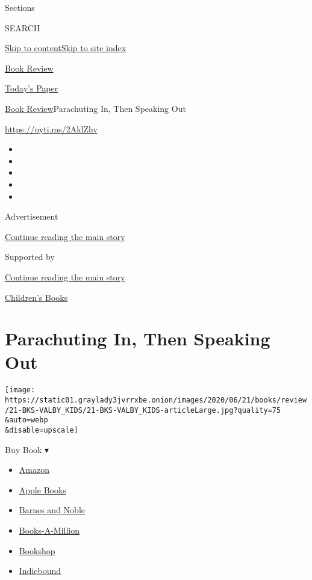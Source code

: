 Sections

SEARCH

\protect\hyperlink{site-content}{Skip to
content}\protect\hyperlink{site-index}{Skip to site index}

\href{https://www.nytimes3xbfgragh.onion/section/books/review}{Book
Review}

\href{https://myaccount.nytimes3xbfgragh.onion/auth/login?response_type=cookie\&client_id=vi}{}

\href{https://www.nytimes3xbfgragh.onion/section/todayspaper}{Today's
Paper}

\href{/section/books/review}{Book Review}\textbar{}Parachuting In, Then
Speaking Out

\url{https://nyti.ms/2AklZhv}

\begin{itemize}
\item
\item
\item
\item
\item
\end{itemize}

Advertisement

\protect\hyperlink{after-top}{Continue reading the main story}

Supported by

\protect\hyperlink{after-sponsor}{Continue reading the main story}

\href{/column/childrens-books}{Children's Books}

\hypertarget{parachuting-in-then-speaking-out}{%
\section{Parachuting In, Then Speaking
Out}\label{parachuting-in-then-speaking-out}}

\texttt{[image: https://static01.graylady3jvrrxbe.onion/images/2020/06/21/books/review/21-BKS-VALBY\_KIDS/21-BKS-VALBY\_KIDS-articleLarge.jpg?quality=75\\\&auto=webp\\\&disable=upscale]}

Buy Book ▾

\begin{itemize}
\tightlist
\item
  \href{https://www.amazon.com/gp/search?index=books\&tag=NYTBSREV-20\&field-keywords=Parachutes+Kelly+Yang}{Amazon}
\item
  \href{https://du-gae-books-dot-nyt-du-prd.appspot.com/buy?title=Parachutes\&author=Kelly+Yang}{Apple
  Books}
\item
  \href{https://www.anrdoezrs.net/click-7990613-11819508?url=https\%3A\%2F\%2Fwww.barnesandnoble.com\%2Fw\%2F\%3Fean\%3D9780062941084}{Barnes
  and Noble}
\item
  \href{https://www.anrdoezrs.net/click-7990613-35140?url=https\%3A\%2F\%2Fwww.booksamillion.com\%2Fp\%2FParachutes\%2FKelly\%2BYang\%2F9780062941084}{Books-A-Million}
\item
  \href{https://bookshop.org/a/3546/9780062941084}{Bookshop}
\item
  \href{https://www.indiebound.org/book/9780062941084?aff=NYT}{Indiebound}
\end{itemize}

